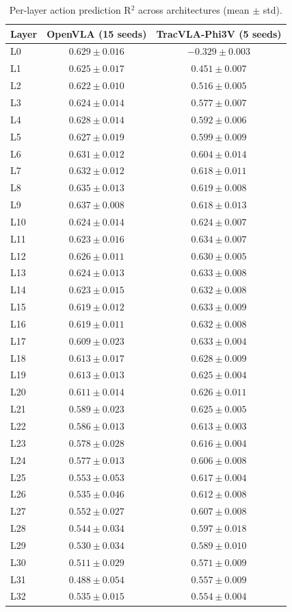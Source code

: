 \begin{table}[t]
\centering
\caption{Per-layer action prediction R$^2$ across architectures (mean $\pm$ std).}
\label{tab:cross_arch_r2}
\begin{tabular}{lcc}
\toprule
Layer & OpenVLA (15 seeds) & TracVLA-Phi3V (5 seeds) \\
\midrule
L0  & $0.629 \pm 0.016$ & $-0.329 \pm 0.003$ \\
L1  & $0.625 \pm 0.017$ & $0.451 \pm 0.007$ \\
L2  & $0.622 \pm 0.010$ & $0.516 \pm 0.005$ \\
L3  & $0.624 \pm 0.014$ & $0.577 \pm 0.007$ \\
L4  & $0.628 \pm 0.014$ & $0.592 \pm 0.006$ \\
L5  & $0.627 \pm 0.019$ & $0.599 \pm 0.009$ \\
L6  & $0.631 \pm 0.012$ & $0.604 \pm 0.014$ \\
L7  & $0.632 \pm 0.012$ & $0.618 \pm 0.011$ \\
L8  & $0.635 \pm 0.013$ & $0.619 \pm 0.008$ \\
L9  & $\mathbf{0.637 \pm 0.008}$ & $0.618 \pm 0.013$ \\
L10 & $0.624 \pm 0.014$ & $0.624 \pm 0.007$ \\
L11 & $0.623 \pm 0.016$ & $\mathbf{0.634 \pm 0.007}$ \\
L12 & $0.626 \pm 0.011$ & $0.630 \pm 0.005$ \\
L13 & $0.624 \pm 0.013$ & $0.633 \pm 0.008$ \\
L14 & $0.623 \pm 0.015$ & $0.632 \pm 0.008$ \\
L15 & $0.619 \pm 0.012$ & $0.633 \pm 0.009$ \\
L16 & $0.619 \pm 0.011$ & $0.632 \pm 0.008$ \\
L17 & $0.609 \pm 0.023$ & $0.633 \pm 0.004$ \\
L18 & $0.613 \pm 0.017$ & $0.628 \pm 0.009$ \\
L19 & $0.613 \pm 0.013$ & $0.625 \pm 0.004$ \\
L20 & $0.611 \pm 0.014$ & $0.626 \pm 0.011$ \\
L21 & $0.589 \pm 0.023$ & $0.625 \pm 0.005$ \\
L22 & $0.586 \pm 0.013$ & $0.613 \pm 0.003$ \\
L23 & $0.578 \pm 0.028$ & $0.616 \pm 0.004$ \\
L24 & $0.577 \pm 0.013$ & $0.606 \pm 0.008$ \\
L25 & $0.553 \pm 0.053$ & $0.617 \pm 0.004$ \\
L26 & $0.535 \pm 0.046$ & $0.612 \pm 0.008$ \\
L27 & $0.552 \pm 0.027$ & $0.607 \pm 0.008$ \\
L28 & $0.544 \pm 0.034$ & $0.597 \pm 0.018$ \\
L29 & $0.530 \pm 0.034$ & $0.589 \pm 0.010$ \\
L30 & $0.511 \pm 0.029$ & $0.571 \pm 0.009$ \\
L31 & $0.488 \pm 0.054$ & $0.557 \pm 0.009$ \\
L32 & $0.535 \pm 0.015$ & $0.554 \pm 0.004$ \\
\bottomrule
\end{tabular}
\end{table}
